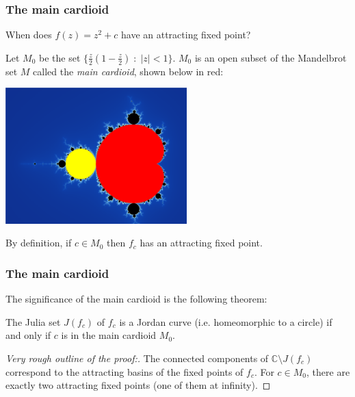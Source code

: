 \documentclass{beamer} %
\theoremstyle{definition} %
\newcommand{\Cplx}{\mathbb{C}}
\begin{document}
\begin{frame}\frametitle{The main cardioid}
    When does $f(z) = z^2+c$ have an attracting fixed point? 
    
    Let $M_0$ be the set $\{\frac{z}{2}(1-\frac{z}{2})\;:\;|z|<1\}$. $M_0$ is 
    an open subset of the Mandelbrot set $M$ called the \emph{main cardioid}, shown below in red:
    \begin{center}
        \includegraphics[width=70mm]{img/main-cardioid.png}
    \end{center}
    By definition, if $c \in M_0$ then $f_c$ has an attracting fixed point.
\end{frame}

\begin{frame}\frametitle{The main cardioid}
    The significance of the main cardioid is the following theorem:
    \begin{theorem}
        The Julia set $J(f_c)$ of $f_c$ is a Jordan curve (i.e. homeomorphic to a circle) if and only if $c$ is in the main cardioid $M_0$.
    \end{theorem}
    \begin{proof}[Very rough outline of the proof:]
        The connected components of $\Cplx\setminus J(f_c)$ correspond to the attracting basins of the fixed points of $f_c$. For $c \in M_0$,
        there are exactly two attracting fixed points (one of them at infinity). 
    \end{proof}
\end{frame}

\end{document}
